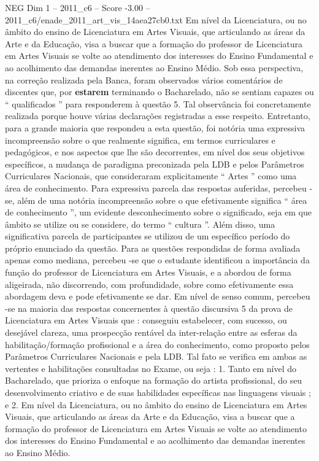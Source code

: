\begin{textsample}{NEG Dim 1 – 2011\_c6 – Score -3.00 – 2011\_c6/enade\_2011\_art\_vis\_14aea27cb0.txt}
Em nível da Licenciatura, ou no âmbito do ensino de Licenciatura em Artes Visuais, que articulando as áreas da Arte e da Educação, visa a buscar que a formação do professor de Licenciatura em Artes Visuais se volte ao atendimento dos interesses do Ensino Fundamental e ao acolhimento das demandas inerentes ao Ensino Médio.
Sob essa perspectiva, na correção realizada pela Banca, foram observados vários comentários de discentes que, por \textbf{estarem} terminando o Bacharelado, não se sentiam capazes ou “ qualificados ” para responderem à questão 5.
Tal observância foi concretamente realizada porque houve várias declarações registradas a esse respeito.
Entretanto, para a grande maioria que respondeu a esta questão, foi notória uma expressiva incompreensão sobre o que realmente significa, em termos curriculares e pedagógicos, e nos aspectos que lhe são decorrentes, em nível dos seus objetivos específicos, a mudança de paradigma preconizada pela LDB e pelos Parâmetros Curriculares Nacionais, que consideraram explicitamente “ Artes ” como uma área de conhecimento.
Para expressiva parcela das respostas auferidas, percebeu -se, além de uma notória incompreensão sobre o que efetivamente significa “ área de conhecimento ”, um evidente desconhecimento sobre o significado, seja em que âmbito se utilize ou se considere, do termo “ cultura ”.
Além disso, uma significativa parcela de participantes se utilizou de um específico período do próprio enunciado da questão.
Para as questões respondidas de forma avaliada apenas como mediana, percebeu -se que o estudante identificou a importância da função do professor de Licenciatura em Artes Visuais, e a abordou de forma aligeirada, não discorrendo, com profundidade, sobre como efetivamente essa abordagem deva e pode efetivamente se dar.
Em nível de senso comum, percebeu -se na maioria das respostas concernentes à questão discursiva 5 da prova de Licenciatura em Artes Visuais que : conseguiu estabelecer, com sucesso, ou desejável clareza, uma prospecção rentável da inter-relação entre as esferas da habilitação/formação profissional e a área do conhecimento, como proposto pelos Parâmetros Curriculares Nacionais e pela LDB.
Tal fato se verifica em ambas as vertentes e habilitações consultadas no Exame, ou seja : 1.
Tanto em nível do Bacharelado, que prioriza o enfoque na formação do artista profissional, do seu desenvolvimento criativo e de suas habilidades específicas nas linguagens visuais ; e 2.
Em nível da Licenciatura, ou no âmbito do ensino de Licenciatura em Artes Visuais, que articulando as áreas da Arte e da Educação, visa a buscar que a formação do professor de Licenciatura em Artes Visuais se volte ao atendimento dos interesses do Ensino Fundamental e ao acolhimento das demandas inerentes ao Ensino Médio.

\end{textsample}

